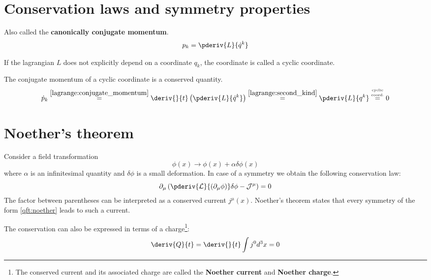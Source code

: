 \section{Conservation laws and symmetry properties}
	\begin{definition}
    	Also called the \textbf{canonically conjugate momentum}.
    	\begin{equation}
			\label{lagrange:conjugate_momentum}
            p_k = \pderiv{L}{\dot{q}^k}
		\end{equation}
	\end{definition}
    \begin{definition}
    	If the lagrangian $L$ does not explicitly depend on a coordinate $q_k$, the coordinate is called a cyclic coordinate.
	\end{definition}
    
	\begin{property}
		The conjugate momentum of a cyclic coordinate is a conserved quantity.
		\begin{equation}
			\dot{p}_k \overset{\ref{lagrange:conjugate_momentum}}{=} \deriv{}{t}\left(\pderiv{L}{\dot{q}^k}\right) \overset{{\ref{lagrange:second_kind}}}{=}\pderiv{L}{q^k} \overset{\underset{\text{\tiny{coord.}}}{\text{\tiny{cyclic}}}}{=} 0
		\end{equation}
	\end{property}

\section{Noether's theorem}

	\begin{theorem}\label{qft:noethers_theorem}
		Consider a field transformation
		\begin{equation}
			\label{qft:noether}
			\phi(x)\rightarrow \phi(x) + \alpha\delta\phi(x)
		\end{equation}
		where $\alpha$ is an infinitesimal quantity and $\delta\phi$ is a small deformation. In case of a symmetry we obtain the following conservation law:
		 \begin{equation}
		 	\label{qft:conserved_current}
		 	\partial_\mu\left(\pderiv{\mathcal{L}}{(\partial_\mu\phi)}\delta\phi - \mathcal{J}^\mu\right) = 0
		 \end{equation}
		 The factor between parentheses can be interpreted as a conserved current $j^\mu(x)$. Noether's theorem states that every symmetry of the form \ref{qft:noether} leads to such a current.
		 
		 The conservation can also be expressed in terms of a charge\footnote{The conserved current and its associated charge are called the \textbf{Noether current} and \textbf{Noether charge}.}:
		 \begin{equation}
		 	\deriv{Q}{t} = \deriv{}{t}\int j^0d^3x = 0
		 \end{equation}
	\end{theorem}

